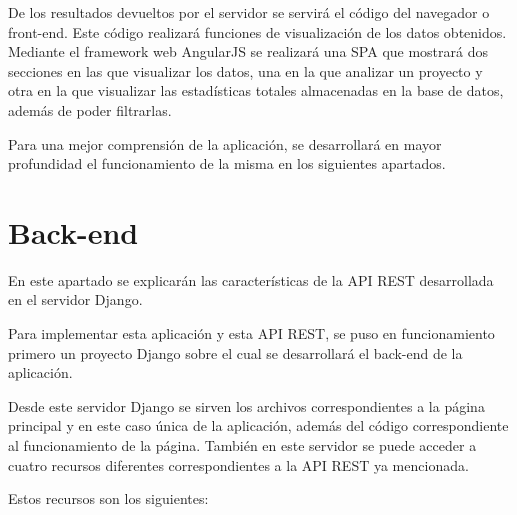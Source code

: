 \documentclass[a4paper, spanish, 12pt]{book}
\begin{document}
De los resultados devueltos por el servidor se servir\'a el c\'odigo del navegador
o front-end. Este c\'odigo realizar\'a funciones de visualizaci\'on de los datos
obtenidos. Mediante el framework web AngularJS se realizar\'a una SPA que mostrar\'a
dos secciones en las que visualizar los datos, una en la que analizar un proyecto
y otra en la que visualizar las estad\'isticas totales almacenadas en la base de datos,
adem\'as de poder filtrarlas.

Para una mejor comprensi\'on de la aplicaci\'on, se desarrollar\'a en mayor profundidad
el funcionamiento de la misma en los siguientes apartados.




\section{Back-end}
\label{sec:back-end}

En este apartado se explicar\'an las caracter\'isticas de la API REST desarrollada
en el servidor Django.

Para implementar esta aplicaci\'on y esta API REST, se puso en funcionamiento
primero un proyecto Django sobre el cual se desarrollar\'a el back-end de la aplicaci\'on.

Desde este servidor Django se sirven los archivos correspondientes a la p\'agina
principal y en este caso \'unica de la aplicaci\'on, adem\'as del c\'odigo correspondiente
al funcionamiento de la p\'agina. Tambi\'en en este servidor se puede acceder a
cuatro recursos diferentes correspondientes a la API REST ya mencionada.

Estos recursos son los siguientes:
\end{document}
